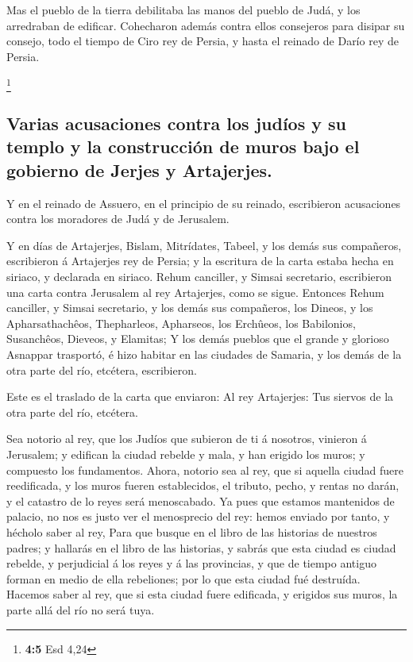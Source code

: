  Mas el pueblo de la tierra debilitaba las manos del
pueblo de Judá, y los arredraban de edificar.  Cohecharon
además contra ellos consejeros para disipar su consejo, todo el tiempo
de Ciro rey de Persia, y hasta el reinado de Darío rey de Persia.

\footnote{\textbf{4:5} Esd 4,24}

\hypertarget{varias-acusaciones-contra-los-juduxedos-y-su-templo-y-la-construcciuxf3n-de-muros-bajo-el-gobierno-de-jerjes-y-artajerjes.}{%
\subsection{Varias acusaciones contra los judíos y su templo y la
construcción de muros bajo el gobierno de Jerjes y
Artajerjes.}\label{varias-acusaciones-contra-los-juduxedos-y-su-templo-y-la-construcciuxf3n-de-muros-bajo-el-gobierno-de-jerjes-y-artajerjes.}}

 Y en el reinado de Assuero, en el principio de su
reinado, escribieron acusaciones contra los moradores de Judá y de
Jerusalem.

 Y en días de Artajerjes, Bislam, Mitrídates, Tabeel, y
los demás sus compañeros, escribieron á Artajerjes rey de Persia; y la
escritura de la carta estaba hecha en siriaco, y declarada en siriaco.
 Rehum canciller, y Simsai secretario, escribieron una
carta contra Jerusalem al rey Artajerjes, como se sigue. 
Entonces Rehum canciller, y Simsai secretario, y los demás sus
compañeros, los Dineos, y los Apharsathachêos, Thepharleos, Apharseos,
los Erchûeos, los Babilonios, Susanchêos, Dieveos, y Elamitas;
 Y los demás pueblos que el grande y glorioso Asnappar
trasportó, é hizo habitar en las ciudades de Samaria, y los demás de la
otra parte del río, etcétera, escribieron.

 Este es el traslado de la carta que enviaron: Al rey
Artajerjes: Tus siervos de la otra parte del río, etcétera.

 Sea notorio al rey, que los Judíos que subieron de ti á
nosotros, vinieron á Jerusalem; y edifican la ciudad rebelde y mala, y
han erigido los muros; y compuesto los fundamentos. 
Ahora, notorio sea al rey, que si aquella ciudad fuere reedificada, y
los muros fueren establecidos, el tributo, pecho, y rentas no darán, y
el catastro de lo reyes será menoscabado.  Ya pues que
estamos mantenidos de palacio, no nos es justo ver el menosprecio del
rey: hemos enviado por tanto, y hécholo saber al rey, 
Para que busque en el libro de las historias de nuestros padres; y
hallarás en el libro de las historias, y sabrás que esta ciudad es
ciudad rebelde, y perjudicial á los reyes y á las provincias, y que de
tiempo antiguo forman en medio de ella rebeliones; por lo que esta
ciudad fué destruída.  Hacemos saber al rey, que si esta
ciudad fuere edificada, y erigidos sus muros, la parte allá del río no
será tuya.

